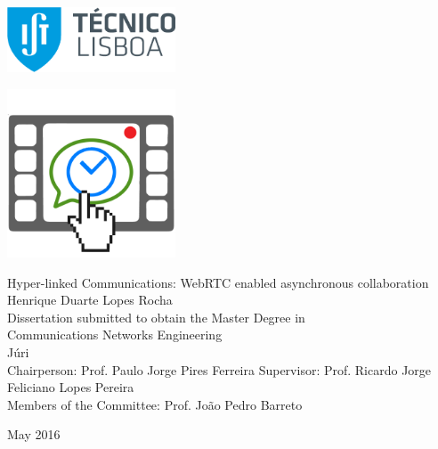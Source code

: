 \thispagestyle {empty}

\includegraphics[width=5.0cm]{Logo.png}

\begin{center}
%
\vspace{0.3cm}
\hspace{-0.5cm}\includegraphics[height=50mm]{Figures/logo.png}

\vspace{0.8cm}
{\FontLb Hyper-linked Communications: WebRTC enabled asynchronous collaboration} \\
\vspace{2.6cm}
{\FontMb Henrique Duarte Lopes Rocha} \\
\vspace{1.9cm}
{\FontLn Dissertation submitted to obtain the Master Degree in} \\
\vspace{0.3cm}
{\FontLb Communications Networks Engineering} \\
\vspace{1.9cm}
{\FontMb J\'{u}ri} \\
\vspace{0.3cm}
{\FontSn %
Chairperson: 	   Prof. Paulo Jorge Pires Ferreira
Supervisor:        Prof. Ricardo Jorge Feliciano Lopes Pereira \\
Members of the Committee: Prof. João Pedro Barreto
}
\vspace{1.5cm}

{\FontMb May 2016} \\
%
\end{center}

\cleardoublepage

\restoregeometry
